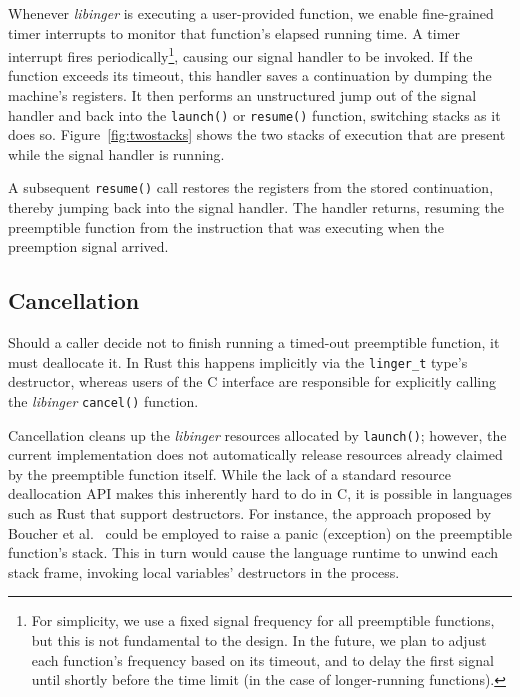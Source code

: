 Whenever \textit{libinger} is executing a user-provided function, we
enable fine-grained timer interrupts to
monitor that function's elapsed running time.  A timer interrupt fires
periodically\footnote{For simplicity, we use a fixed signal frequency for all
preemptible functions, but this is not fundamental to the design.  In the future,
we plan to adjust each function's frequency based on its timeout, and to delay the
first signal until shortly before the time limit (in the case of longer-running
functions).}, causing our signal
handler to be invoked.  If the function exceeds its timeout,
this handler saves a continuation by dumping the machine's registers.  It then
performs an unstructured jump out of the signal handler and back into the
\texttt{launch()} or \texttt{resume()} function, switching stacks as it does so.
Figure~\ref{fig:twostacks} shows the two stacks of execution
that are present while the
signal handler is running.

A subsequent \texttt{resume()} call restores the registers from the stored
continuation, thereby jumping back into the signal handler.  The handler
returns, resuming the preemptible function from the instruction that was executing
when the preemption signal arrived.





\subsection{Cancellation}

Should a caller decide not to finish running a timed-out preemptible function, it
must deallocate it.  In Rust this happens implicitly via the \texttt{linger\_t}
type's destructor, whereas users of the C interface are responsible for explicitly
calling the \textit{libinger} \texttt{cancel()} function.

Cancellation cleans up the \textit{libinger} resources allocated by
\texttt{launch()};
however, the current implementation
does not automatically release resources already claimed by the
preemptible function itself.  While the lack of a standard resource deallocation API
makes this inherently hard to do in C, it is possible in languages
such as Rust that support destructors.  For instance, the approach proposed by
Boucher et al.~\cite{boucher:atc2018} could be employed to raise a panic
(exception) on the preemptible function's stack.  This in turn would cause the
language runtime
to unwind each stack frame, invoking local variables' destructors in
the process.

